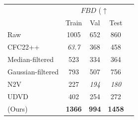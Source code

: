 \begin{tabular}{lcccc}
\toprule
&\multicolumn{3}{c}{$FBD$ ($\uparrow$})\\
    & Train & Val & Test  \\
    \hline
    Raw & 1005 & 652 & 860 \\
    CFC22++\cite{cfc2022eccv} & \textit{63.7} & 368 & 458  \\
    Median-filtered\cite{gonzalez2006meanfilter} & 523 & 334 & 364 \\
    Gaussian-filtered\cite{gonzalez2006meanfilter} & 793 & 507 & 756 \\
    N2V\cite{krull2019noise2void} & 227 & \textit{194} & \textit{180} \\
    UDVD\cite{Sheth_2021_ICCV} & 402 & 254 & 272 \\
    \NAME{} (Ours) & \textbf{1366} & \textbf{994} & \textbf{1458}\\
    \bottomrule
\end{tabular}